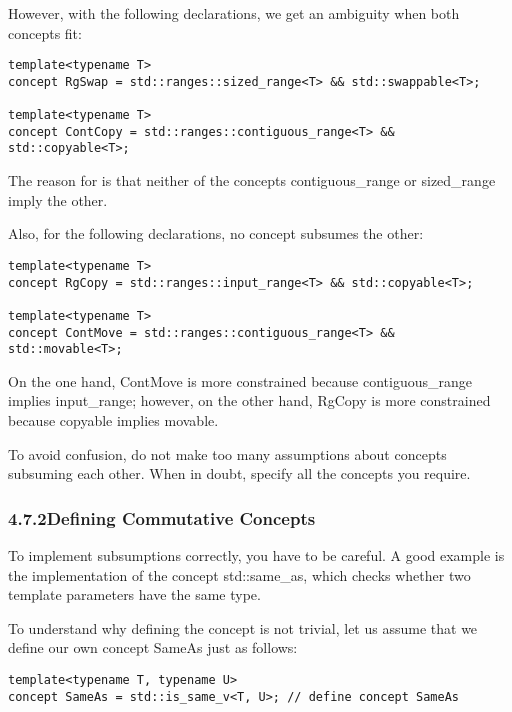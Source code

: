 However, with the following declarations, we get an ambiguity when both concepts fit:

\begin{lstlisting}[style=styleCXX]
template<typename T>
concept RgSwap = std::ranges::sized_range<T> && std::swappable<T>;

template<typename T>
concept ContCopy = std::ranges::contiguous_range<T> && std::copyable<T>;
\end{lstlisting}

The reason for is that neither of the concepts contiguous\_range or sized\_range imply the other.

Also, for the following declarations, no concept subsumes the other:

\begin{lstlisting}[style=styleCXX]
template<typename T>
concept RgCopy = std::ranges::input_range<T> && std::copyable<T>;

template<typename T>
concept ContMove = std::ranges::contiguous_range<T> && std::movable<T>;
\end{lstlisting}

On the one hand, ContMove is more constrained because contiguous\_range implies input\_range; however, on the other hand, RgCopy is more constrained because copyable implies movable.

To avoid confusion, do not make too many assumptions about concepts subsuming each other. When in doubt, specify all the concepts you require.

\subsubsection*{ 4.7.2\hspace{0.2cm}Defining Commutative Concepts}

To implement subsumptions correctly, you have to be careful. A good example is the implementation of the concept std::same\_as, which checks whether two template parameters have the same type.

To understand why defining the concept is not trivial, let us assume that we define our own concept SameAs just as follows:

\begin{lstlisting}[style=styleCXX]
template<typename T, typename U>
concept SameAs = std::is_same_v<T, U>; // define concept SameAs
\end{lstlisting}

